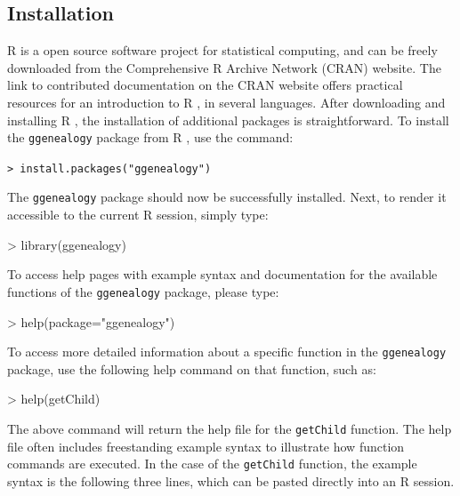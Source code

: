 \documentclass{article}
\numberwithin{equation}{section} %
\newcommand{\pkg}[1]{{\texttt{#1}}}
\newcommand{\R}{{\normalfont\textsf{R }}{}}
\begin{document}
\subsection{Installation}

\R is a open source software project for statistical computing, and can be freely downloaded from the Comprehensive R Archive Network (CRAN) website. The link to contributed documentation on the CRAN website offers practical resources for an introduction to \R, in several languages. After downloading and installing \R, the installation of additional packages is straightforward. To install the \pkg{ggenealogy} package from \R, use the command:

\vspace{2mm}
\noindent
\texttt{> install.packages("ggenealogy")}

\vspace{2mm}
\noindent
The \pkg{ggenealogy} package should now be successfully installed. Next, to render it accessible to the current \R session, simply type:

\begin{Schunk}
\begin{Sinput}
> library(ggenealogy)
\end{Sinput}
\end{Schunk}

To access help pages with example syntax and documentation for the available functions of the \pkg{ggenealogy} package, please type:

\begin{Schunk}
\begin{Sinput}
> help(package="ggenealogy")
\end{Sinput}
\end{Schunk}

To access more detailed information about a specific function in the \pkg{ggenealogy} package, use the following help command on that function, such as:

\begin{Schunk}
\begin{Sinput}
> help(getChild)
\end{Sinput}
\end{Schunk}

The above command will return the help file for the \texttt{getChild} function. The help file often includes freestanding example syntax to illustrate how function commands are executed. In the case of the \texttt{getChild} function, the example syntax is the following three lines, which can be pasted directly into an \R session.
\end{document}
